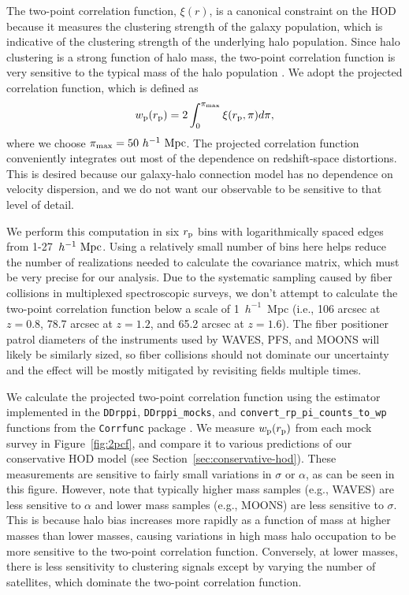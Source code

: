 \documentclass[twocolumn,twocolappendix]{aastex63}
\begin{document}
The two-point correlation function, $\xi(r)$, is a canonical constraint on the HOD because it measures the clustering strength of the galaxy population, which is indicative of the clustering strength of the underlying halo population. Since halo clustering is a strong function of halo mass, the two-point correlation function is very sensitive to the typical mass of the halo population \citep{Zehavi:2005, Reddick:2013, Wang:2019}.
We adopt the projected correlation function, which is defined as
\begin{equation} \label{eq:wp}
    w_{\rm p}(r_{\rm p}) = 2 \int_0^{\pi_{\rm max}}\xi(r_{\rm p}, \pi) d\pi,
\end{equation}
where we choose $\pi_{\rm max} = 50~h^{-1}~{\rm Mpc}$. The projected correlation function conveniently integrates out most of the dependence on redshift-space distortions. This is desired because our galaxy-halo connection model has no dependence on velocity dispersion, and we do not want our observable to be sensitive to that level of detail.


We perform this computation in six $r_{\rm p}$ bins with logarithmically spaced edges from 1-27~$h^{-1}~{\rm Mpc}$.
Using a relatively small number of bins here helps reduce the number of realizations needed to calculate the covariance matrix, which must be very precise for our analysis.
Due to the systematic sampling caused by fiber collisions in multiplexed spectroscopic surveys, we don't attempt to calculate the two-point correlation function below a scale of 1~$h^{-1}$~Mpc (i.e., 106 arcsec at $z=0.8$, 78.7 arcsec at $z=1.2$, and 65.2 arcsec at $z=1.6$). 
The fiber positioner patrol diameters of the instruments used by WAVES, PFS, and MOONS will likely be similarly sized, so fiber collisions should not dominate our uncertainty and the effect will be mostly mitigated by revisiting fields multiple times.

We calculate the projected two-point correlation function using the \citet{Landy:Szalay:1993} estimator implemented in the \verb|DDrppi|, \verb|DDrppi_mocks|, and \verb|convert_rp_pi_counts_to_wp| functions from the \verb|Corrfunc| package \citep{Sinha:2020}. We measure $w_{\rm p}(r_{\rm p})$ from each mock survey in Figure~\ref{fig:2pcf}, and compare it to various predictions of our conservative HOD model (see Section~\ref{sec:conservative-hod}). These measurements are sensitive to fairly small variations in $\sigma$ or $\alpha$, as can be seen in this figure. However, note that typically higher mass samples (e.g., WAVES) are less sensitive to $\alpha$ and lower mass samples (e.g., MOONS) are less sensitive to $\sigma$. This is because halo bias increases more rapidly as a function of mass at higher masses than lower masses, causing variations in high mass halo occupation to be more sensitive to the two-point correlation function. Conversely, at lower masses, there is less sensitivity to clustering signals except by varying the number of satellites, which dominate the two-point correlation function.
\end{document}
